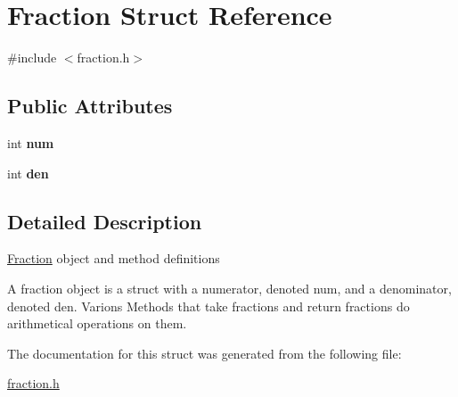 \hypertarget{structFraction}{\section{Fraction Struct Reference}
\label{structFraction}
}


{\ttfamily \#include $<$fraction.\+h$>$}

\subsection*{Public Attributes}
\begin{DoxyCompactItemize}
\item 
\hypertarget{structFraction_a0e81f0bdfef58ab65594e1178bea9217}{int {\bfseries num}}\label{structFraction_a0e81f0bdfef58ab65594e1178bea9217}

\item 
\hypertarget{structFraction_a4f13c650e1665bc6351c98c400359c44}{int {\bfseries den}}\label{structFraction_a4f13c650e1665bc6351c98c400359c44}

\end{DoxyCompactItemize}


\subsection{Detailed Description}
\hyperlink{structFraction}{Fraction} object and method definitions

A fraction object is a struct with a numerator, denoted num, and a denominator, denoted den. Varions Methods that take fractions and return fractions do arithmetical operations on them. 

The documentation for this struct was generated from the following file\+:\begin{DoxyCompactItemize}
\item 
\hyperlink{fraction_8h}{fraction.\+h}\end{DoxyCompactItemize}
